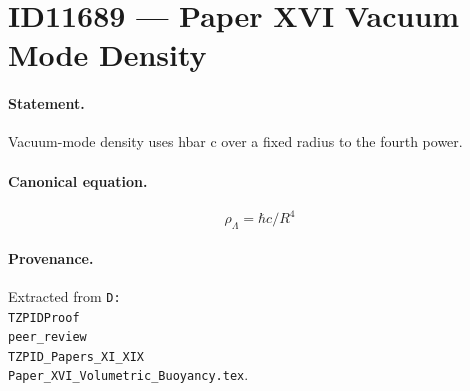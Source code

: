 \section*{ID11689 --- Paper XVI Vacuum Mode Density}

\paragraph{Statement.}
Vacuum-mode density uses hbar c over a fixed radius to the fourth power.

\paragraph{Canonical equation.}
\[
\rho_\Lambda=\hbar c/R^4
\]

\paragraph{Provenance.}
Extracted from \texttt{D:\\TZPIDProof\\peer\_review\\TZPID\_Papers\_XI\_XIX\\Paper\_XVI\_Volumetric\_Buoyancy.tex}.
